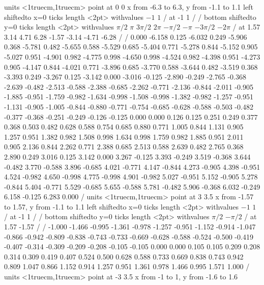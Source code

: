 \figure
\texonly
\vbox{\beginpicture
\normalgraphs
\sevenpoint
\setcoordinatesystem units <1truecm,1truecm> point at 0 0
\setplotarea x from -6.3 to 6.3, y from -1.1 to 1.1
\axis left shiftedto x=0 ticks length <2pt> withvalues {$-1$} {$1$} / at -1 1 / /
\axis bottom shiftedto y=0 ticks length <2pt> withvalues 
  {$\pi/2$} {$\pi$} {$3\pi/2$} {$2\pi$} {$-\pi/2$} {$-\pi$} {$-3\pi/2$} {$-2\pi$} /
  at 1.57 3.14 4.71 6.28 -1.57 -3.14 -4.71 -6.28 / /
\setquadratic
{} 0.000 -6.158 0.125 -6.032 0.249 -5.906 0.368 -5.781 0.482 
-5.655 0.588 -5.529 0.685 -5.404 0.771 -5.278 0.844 -5.152 0.905 
-5.027 0.951 -4.901 0.982 -4.775 0.998 -4.650 0.998 -4.524 0.982 
-4.398 0.951 -4.273 0.905 -4.147 0.844 -4.021 0.771 -3.896 0.685 
-3.770 0.588 -3.644 0.482 -3.519 0.368 -3.393 0.249 -3.267 0.125 
-3.142 0.000 -3.016 -0.125 -2.890 -0.249 -2.765 -0.368 -2.639 -0.482 
-2.513 -0.588 -2.388 -0.685 -2.262 -0.771 -2.136 -0.844 -2.011 -0.905 
-1.885 -0.951 -1.759 -0.982 -1.634 -0.998 -1.508 -0.998 -1.382 -0.982 
-1.257 -0.951 -1.131 -0.905 -1.005 -0.844 -0.880 -0.771 -0.754 -0.685 
-0.628 -0.588 -0.503 -0.482 -0.377 -0.368 -0.251 -0.249 -0.126 -0.125 
0.000 0.000 0.126 0.125 0.251 0.249 0.377 0.368 0.503 0.482 
0.628 0.588 0.754 0.685 0.880 0.771 1.005 0.844 1.131 0.905 
1.257 0.951 1.382 0.982 1.508 0.998 1.634 0.998 1.759 0.982 
1.885 0.951 2.011 0.905 2.136 0.844 2.262 0.771 2.388 0.685 
2.513 0.588 2.639 0.482 2.765 0.368 2.890 0.249 3.016 0.125 
3.142 0.000 3.267 -0.125 3.393 -0.249 3.519 -0.368 3.644 -0.482 
3.770 -0.588 3.896 -0.685 4.021 -0.771 4.147 -0.844 4.273 -0.905 
4.398 -0.951 4.524 -0.982 4.650 -0.998 4.775 -0.998 4.901 -0.982 
5.027 -0.951 5.152 -0.905 5.278 -0.844 5.404 -0.771 5.529 -0.685 
5.655 -0.588 5.781 -0.482 5.906 -0.368 6.032 -0.249 6.158 -0.125 
6.283 0.000 /
\setcoordinatesystem units <1truecm,1truecm> point at 3 3.5
\setplotarea x from -1.57 to 1.57, y from -1.1 to 1.1
\axis left shiftedto x=0 ticks length <2pt> withvalues {$-1$} {$1$} / at -1 1 / /
\axis bottom shiftedto y=0 ticks length <2pt> withvalues 
  {$\pi/2$} {$-\pi/2$} /
  at 1.57 -1.57 / /
\setquadratic
{} -1.000 -1.466 -0.995 -1.361 -0.978 -1.257 -0.951 -1.152 -0.914 
-1.047 -0.866 -0.942 -0.809 -0.838 -0.743 -0.733 -0.669 -0.628 -0.588 
-0.524 -0.500 -0.419 -0.407 -0.314 -0.309 -0.209 -0.208 -0.105 -0.105 
0.000 0.000 0.105 0.105 0.209 0.208 0.314 0.309 0.419 0.407 
0.524 0.500 0.628 0.588 0.733 0.669 0.838 0.743 0.942 0.809 
1.047 0.866 1.152 0.914 1.257 0.951 1.361 0.978 1.466 0.995 
1.571 1.000 /
\setcoordinatesystem units <1truecm,1truecm> point at -3 3.5
\setplotarea x from -1 to 1, y from -1.6 to 1.6
}

